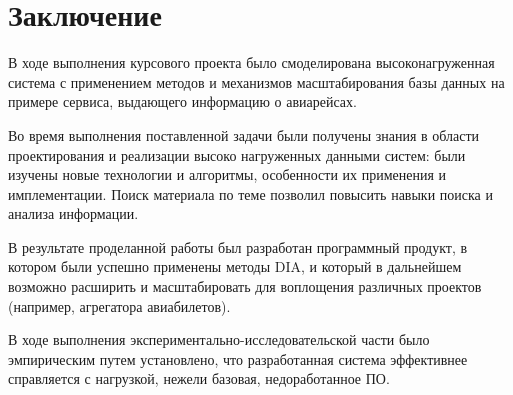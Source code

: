 \chapter*{Заключение}

В ходе выполнения курсового проекта было смоделирована высоконагруженная система с применением методов и механизмов масштабирования базы данных на примере сервиса, выдающего информацию о авиарейсах.

Во время выполнения поставленной задачи были получены знания в области проектирования и реализации высоко нагруженных данными систем: были изучены новые технологии и алгоритмы, особенности их применения и имплементации. Поиск материала по теме позволил повысить навыки поиска и анализа информации.

В результате проделанной работы был разработан программный продукт, в котором были успешно применены методы DIA, и который в дальнейшем возможно расширить и масштабировать для воплощения различных проектов (например, агрегатора авиабилетов).

В ходе выполнения экспериментально-исследовательской части было эмпирическим путем установлено, что разработанная система эффективнее справляется с нагрузкой, нежели базовая, недоработанное ПО.